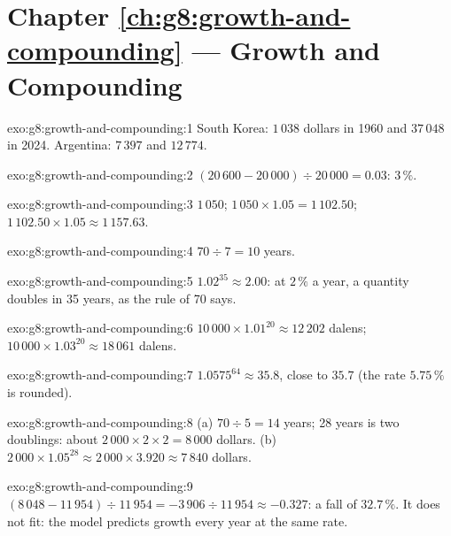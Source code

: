 \section*{Chapter \ref{ch:g8:growth-and-compounding} --- Growth and Compounding}

\begin{solution}{exo:g8:growth-and-compounding:1}
South Korea: $1\,038$ dollars in 1960 and $37\,048$ in 2024. Argentina: $7\,397$ and $12\,774$.
\end{solution}

\begin{solution}{exo:g8:growth-and-compounding:2}
$(20\,600 - 20\,000) \div 20\,000 = 0.03$: $3\,\%$.
\end{solution}

\begin{solution}{exo:g8:growth-and-compounding:3}
$1\,050$; $1\,050 \times 1.05 = 1\,102.50$; $1\,102.50 \times 1.05 \approx 1\,157.63$.
\end{solution}

\begin{solution}{exo:g8:growth-and-compounding:4}
$70 \div 7 = 10$ years.
\end{solution}

\begin{solution}{exo:g8:growth-and-compounding:5}
$1.02^{35} \approx 2.00$: at $2\,\%$ a year, a quantity doubles in 35 years, as the rule of 70 says.
\end{solution}

\begin{solution}{exo:g8:growth-and-compounding:6}
$10\,000 \times 1.01^{20} \approx 12\,202$ dalens; $10\,000 \times 1.03^{20} \approx 18\,061$ dalens.
\end{solution}

\begin{solution}{exo:g8:growth-and-compounding:7}
$1.0575^{64} \approx 35.8$, close to $35.7$ (the rate $5.75\,\%$ is rounded).
\end{solution}

\begin{solution}{exo:g8:growth-and-compounding:8}
(a)  $70 \div 5 = 14$ years; 28 years is two doublings: about $2\,000 \times 2 \times 2 =
8\,000$ dollars. (b) $2\,000 \times 1.05^{28} \approx 2\,000 \times 3.920 \approx 7\,840$ dollars.
\end{solution}

\begin{solution}{exo:g8:growth-and-compounding:9}
$(8\,048 - 11\,954) \div 11\,954 = -3\,906 \div 11\,954 \approx -0.327$: a fall of $32.7\,\%$. It does
not fit: the model predicts growth every year at the same rate.
\end{solution}

